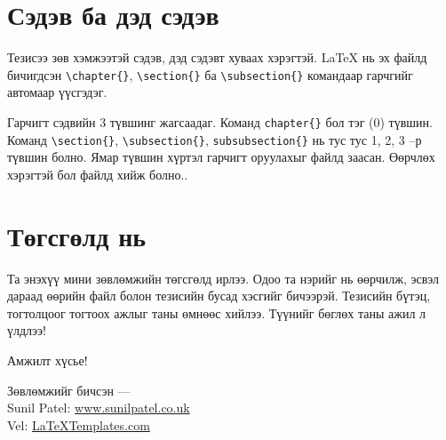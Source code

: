
\section{Сэдэв ба дэд сэдэв}

Тезисээ зөв хэмжээтэй сэдэв, дэд сэдэвт хуваах хэрэгтэй. \LaTeX{} нь эх файлд бичигдсэн \verb|\chapter{}|, \verb|\section{}|  ба \verb|\subsection{}| командаар гарчгийг автомаар үүсгэдэг.

Гарчигт сэдвийн 3 түвшинг жагсаадаг. Команд \verb|chapter{}| бол тэг (0) түвшин. Команд \verb|\section{}|, \verb|\subsection{}|, \verb|subsubsection{}| нь тус тус 1, 2, 3 --р түвшин болно. Ямар түвшин хүртэл гарчигт оруулахыг  файлд заасан. Өөрчлөх хэрэгтэй бол  файлд хийж болно..


\section{Төгсгөлд нь}

Та энэхүү мини зөвлөмжийн төгсгөлд ирлээ. Одоо та нэрийг нь өөрчилж, эсвэл дараад өөрийн  файл болон тезисийн бусад хэсгийг бичээрэй. Тезисийн бүтэц, тогтолцоог тогтоох ажлыг таны өмнөөс хийлээ. Түүнийг бөглөх таны ажил л үлдлээ!

Амжилт хүсье!

\begin{flushright}
Зөвлөмжийг бичсэн ---\\
Sunil Patel: \href{http://www.sunilpatel.co.uk}{www.sunilpatel.co.uk}\\
Vel: \href{http://www.LaTeXTemplates.com}{LaTeXTemplates.com}
\end{flushright}
